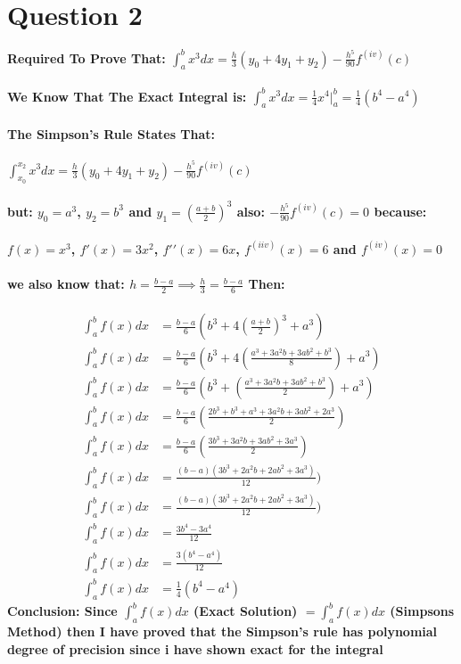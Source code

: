 \documentclass{article}
\begin{document}
\pagebreak
\section*{Question 2}
\textbf{Required To Prove That: $\int_{a}^{b} x^3 dx = \frac{h}{3}(y_0 + 4y_1 + y_2) - \frac{h^5}{90} f^{(iv)}(c)$ \\ \\}
\textbf{We Know That The Exact Integral is: $\int_{a}^{b}x^3 dx = \frac{1}{4}x^4 |_{a}^{b} = \frac{1}{4}(b^4 - a^4)$\\ \\  The Simpson's Rule States That:\\ \\ }
\textbf{$\int_{x_0}^{x_2} x^3 dx = \frac{h}{3}(y_0 + 4y_1 + y_2) - \frac{h^5}{90} f^{(iv)}(c) $ \\ \\ but: $y_0 = a^3 $, $y_2 = b^3$ and $y_1 = (\frac{a + b}{2})^3$ also: $ -\frac{h^5}{90} f^{(iv)}(c) = 0$ because:\\ \\ 
$f(x) = x^3$, $f{\prime}(x) = 3x^2$, $f{\prime \prime}(x) = 6x$, $f^{(iiv)}(x) = 6$ and $f^{(iv)}(x) = 0  $ \\ \\ we also know that: $h = \frac{b - a}{2} \implies \frac{h}{3} = \frac{b - a}{6}$ Then:\\ \\}
\begin{align*}
    \int_{a}^{b}f(x)dx &= \frac{b - a}{6}(b^3 + 4(\frac{a + b}{2})^3 + a^3) \\
    \int_{a}^{b}f(x)dx &= \frac{b - a}{6}(b^3 + 4(\frac{a^3 +3a^2b + 3ab^2 + b^3}{8}) + a^3)\\
    \int_{a}^{b}f(x)dx &= \frac{b - a}{6}(b^3 + (\frac{a^3 +3a^2b + 3ab^2 + b^3}{2}) + a^3) \\
    \int_{a}^{b}f(x)dx &= \frac{b - a}{6}(\frac{2b^3 + b^3 + a^3 + 3a^2b + 3ab^2 + 2a^3}{2})\\
    \int_{a}^{b}f(x)dx &= \frac{b - a}{6}(\frac{3b^3 +3a^2b + 3ab^2 + 3a^3}{2})\\
    \int_{a}^{b}f(x)dx &= \frac{(b - a)(3b^3 +2a^2b + 2ab^2 + 3a^3)}{12})\\
    \int_{a}^{b}f(x)dx &= \frac{(b - a)(3b^3 +2a^2b + 2ab^2 + 3a^3)}{12})\\
    \int_{a}^{b}f(x)dx &= \frac{3b^4 - 3a^4}{12}\\
    \int_{a}^{b}f(x)dx &= \frac{3(b^4 - a^4)}{12}\\
    \int_{a}^{b}f(x)dx &= \frac{1}{4}(b^4 - a^4)
\end{align*}
\textbf{Conclusion: Since $\int_{a}^{b}f(x)dx$ (Exact Solution) $ = \int_{a}^{b}f(x)dx$ (Simpsons Method) then I have proved that the Simpson’s rule has polynomial degree of precision since i have shown  exact for the integral}
\end{document}
